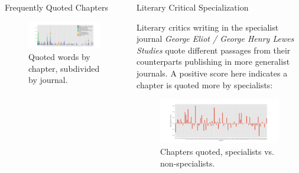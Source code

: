 \documentclass[final]{beamer}
\newlength{\onecolwid}
\newlength{\twocolwid}
\begin{document}
\begin{frame}[t]
\begin{columns}[t]
\begin{column}{\twocolwid}
\begin{columns}[t,totalwidth=\twocolwid]
\begin{column}{\onecolwid}
\begin{block}{Frequently Quoted Chapters}

\begin{figure}
\includegraphics[width=0.9\linewidth]{synchronic-journals.png}
\caption{Quoted words by chapter, subdivided by journal.}
\end{figure}

\end{block}


\end{column} %

\begin{column}{\onecolwid}\vspace{-.6in} %


\begin{block}{Literary Critical Specialization}

Literary critics writing in the specialist journal \emph{George Eliot / George Henry Lewes Studies} quote different passages from their counterparts publishing in more generalist journals. A positive score here indicates a chapter is quoted more by specialists:  

\begin{figure}
\includegraphics[width=0.9\linewidth]{specialization.png}
\caption{Chapters quoted, specialists vs. non-specialists.}
\end{figure}



\end{block}
\end{column}
\end{columns}
\end{column}
\end{columns}
\end{frame}
\end{document}
